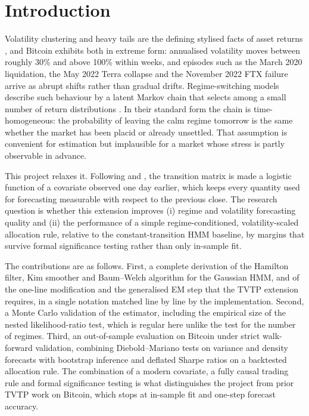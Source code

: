 \documentclass[11pt,a4paper]{article}
\begin{document}
\section{Introduction}
Volatility clustering and heavy tails are the defining stylised facts of asset returns \citep{cont2001}, and Bitcoin exhibits both in extreme form: annualised volatility moves between roughly 30\% and above 100\% within weeks, and episodes such as the March 2020 liquidation, the May 2022 Terra collapse and the November 2022 FTX failure arrive as abrupt shifts rather than gradual drifts. Regime-switching models describe such behaviour by a latent Markov chain that selects among a small number of return distributions \citep{hamilton1989}. In their standard form the chain is time-homogeneous: the probability of leaving the calm regime tomorrow is the same whether the market has been placid or already unsettled. That assumption is convenient for estimation but implausible for a market whose stress is partly observable in advance.

This project relaxes it. Following \citet{filardo1994} and \citet{dlw1994}, the transition matrix is made a logistic function of a covariate observed one day earlier, which keeps every quantity used for forecasting measurable with respect to the previous close. The research question is whether this extension improves (i) regime and volatility forecasting quality and (ii) the performance of a simple regime-conditioned, volatility-scaled allocation rule, relative to the constant-transition HMM baseline, by margins that survive formal significance testing rather than only in-sample fit.

The contributions are as follows. First, a complete derivation of the Hamilton filter, Kim smoother and Baum--Welch algorithm for the Gaussian HMM, and of the one-line modification and the generalised EM step that the TVTP extension requires, in a single notation matched line by line by the implementation. Second, a Monte Carlo validation of the estimator, including the empirical size of the nested likelihood-ratio test, which is regular here unlike the test for the number of regimes. Third, an out-of-sample evaluation on Bitcoin under strict walk-forward validation, combining Diebold--Mariano tests on variance and density forecasts with bootstrap inference and deflated Sharpe ratios on a backtested allocation rule. The combination of a modern covariate, a fully causal trading rule and formal significance testing is what distinguishes the project from prior TVTP work on Bitcoin, which stops at in-sample fit and one-step forecast accuracy.
\end{document}
